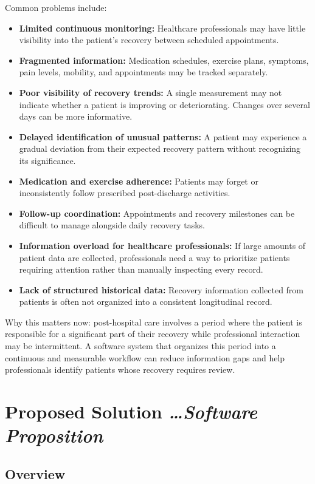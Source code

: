 \documentclass[11pt,a4paper]{article}
\newcommand{\BvrHint}[1]{%
  {\normalfont\normalsize\itshape\hfill #1}}
\begin{document}
Common problems include:
\begin{itemize}[leftmargin=0.7cm]
    \item \textbf{Limited continuous monitoring:} Healthcare professionals may have little visibility into the patient's recovery between scheduled appointments.
    \item \textbf{Fragmented information:} Medication schedules, exercise plans, symptoms, pain levels, mobility, and appointments may be tracked separately.
    \item \textbf{Poor visibility of recovery trends:} A single measurement may not indicate whether a patient is improving or deteriorating. Changes over several days can be more informative.
    \item \textbf{Delayed identification of unusual patterns:} A patient may experience a gradual deviation from their expected recovery pattern without recognizing its significance.
    \item \textbf{Medication and exercise adherence:} Patients may forget or inconsistently follow prescribed post-discharge activities.
    \item \textbf{Follow-up coordination:} Appointments and recovery milestones can be difficult to manage alongside daily recovery tasks.
    \item \textbf{Information overload for healthcare professionals:} If large amounts of patient data are collected, professionals need a way to prioritize patients requiring attention rather than manually inspecting every record.
    \item \textbf{Lack of structured historical data:} Recovery information collected from patients is often not organized into a consistent longitudinal record.
\end{itemize}

Why this matters now: post-hospital care involves a period
where the patient is responsible for a significant part of their recovery while
professional interaction may be intermittent. A software system that organizes
this period into a continuous and measurable workflow can reduce information
gaps and help professionals identify patients whose recovery requires review.

\section{Proposed Solution %
\BvrHint{\ldots Software Proposition}}

\subsection{Overview}
\end{document}
